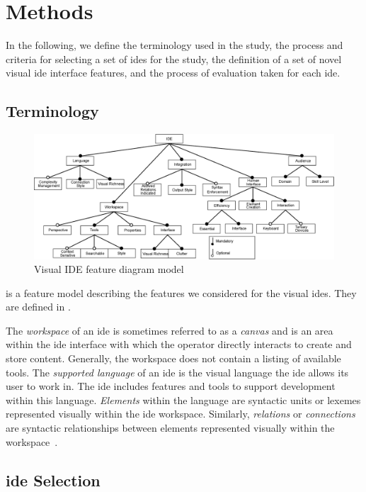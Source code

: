 \section{Methods} \label{sec:methods}

In the following, we define the terminology used in the study, the process and criteria for selecting a set of \acp{ide} for the study, the definition of a set of novel visual \ac{ide} interface features, and the process of evaluation taken for each \ac{ide}.


\subsection{Terminology} \label{subsec:terminology}

\begin{figure}
  \centering
  \includegraphics[width=\textwidth]{images/ide_feature_model}
  \caption{Visual IDE feature diagram model}
  \label{fig:featuremodel}
\end{figure}
%
 is a feature model describing the features we considered for the visual \acp{ide}.
They are defined in .

The \emph{workspace} of an \ac{ide} is sometimes referred to as a
\emph{canvas} and is an area within the \ac{ide} interface with which the
operator directly interacts to create and store content. Generally, the
workspace does not contain a listing of available tools. The \emph{supported
language} of an \ac{ide} is the visual language the \ac{ide} allows its
user to work in. The \ac{ide} includes features and tools to support
development within this language. \emph{Elements} within the language are
syntactic units or lexemes represented visually within the \ac{ide}
workspace. Similarly, \emph{relations} or \emph{connections} are syntactic
relationships between elements represented visually within the workspace~\cite{costagliola2002}.


\subsection{\acs{ide} Selection} \label{subsec:ideselection}

